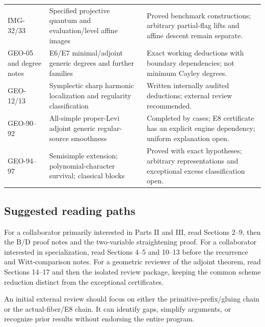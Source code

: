 \begin{longtable}{>{\raggedright\arraybackslash}p{}>{\raggedright\arraybackslash}p{}>{\raggedright\arraybackslash}p{}}
IMG-32/33 & Specified projective quantum and evaluation/level affine images & Proved benchmark constructions; arbitrary partial-flag lifts and affine descent remain separate.\\
GEO-05 and degree notes & E6/E7 minimal/adjoint generic degrees and further families & Exact working deductions with boundary dependencies; not minimum Cayley degrees.\\
GEO-12/13 & Symplectic sharp harmonic localization and regularity classification & Written internally audited deductions; external review recommended.\\
GEO-90--92 & All-simple proper-Levi adjoint generic regular-source smoothness & Completed by cases; E8 certificate has an explicit engine dependency; uniform explanation open.\\
GEO-94--97 & Semisimple extension; polynomial-character survival; classical blocks & Proved with exact hypotheses; arbitrary representations and exceptional excess classification open.\\
\bottomrule
\end{longtable}
\normalsize

\subsection*{Suggested reading paths}
For a collaborator primarily interested in Parts II and III, read Sections 2--9, then the B/D proof notes and the two-variable straightening proof. For a collaborator interested in specialization, read Sections 4--5 and 10--13 before the recurrence and Witt-comparison notes. For a geometric reviewer of the adjoint theorem, read Sections 14--17 and then the isolated review package, keeping the common scheme reduction distinct from the exceptional certificates.

An initial external review should focus on either the primitive-prefix/gluing chain or the actual-fiber/E8 chain. It can identify gaps, simplify arguments, or recognize prior results without endorsing the entire program.
